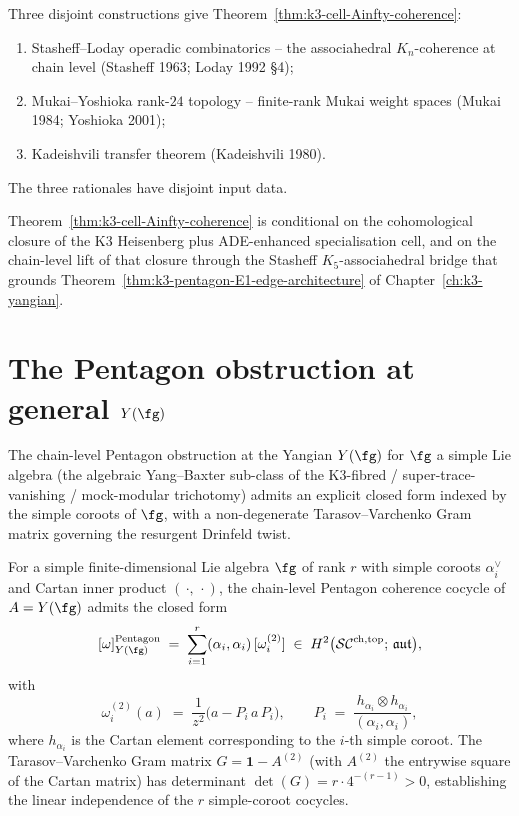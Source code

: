 \begin{remark}
\label{rem:k3-Ainfty-IV}
Three disjoint constructions give
Theorem~\ref{thm:k3-cell-Ainfty-coherence}:
\begin{enumerate}
\item Stasheff--Loday operadic combinatorics -- the associahedral
 $K_n$-coherence at chain level
 \textup{(}Stasheff 1963; Loday 1992 \S 4\textup{);}
\item Mukai--Yoshioka rank-$24$ topology -- finite-rank Mukai
 weight spaces
 \textup{(}Mukai 1984; Yoshioka 2001\textup{);}
\item Kadeishvili transfer theorem
 \textup{(}Kadeishvili 1980\textup{).}
\end{enumerate}
The three rationales have disjoint input data.
\end{remark}

\begin{remark}[Hypotheses]
\label{rem:k3-Ainfty-conditional}
Theorem~\ref{thm:k3-cell-Ainfty-coherence} is conditional on the
cohomological closure of the K$3$ Heisenberg plus ADE-enhanced
specialisation cell, and on the chain-level lift of that closure
through the Stasheff $K_5$-associahedral bridge that grounds
Theorem~\ref{thm:k3-pentagon-E1-edge-architecture} of
Chapter~\ref{ch:k3-yangian}.
\end{remark}


\section{The Pentagon obstruction at general \texorpdfstring{$Y(\fg)$}{Y(g)}}
\label{sec:Y-fg-Pentagon-obstruction}

The chain-level Pentagon obstruction at the Yangian $Y(\fg)$ for
$\fg$ a simple Lie algebra (the algebraic Yang--Baxter sub-class of
the K$3$-fibred / super-trace-vanishing / mock-modular trichotomy)
admits an explicit closed form indexed by the simple coroots of
$\fg$, with a non-degenerate Tarasov--Varchenko Gram matrix governing
the resurgent Drinfeld twist.

\begin{theorem}
\label{thm:Yfg-Pentagon-cartan-coroot}
For a simple finite-dimensional Lie algebra $\fg$ of rank $r$ with
simple coroots $\alpha_i^\vee$ and Cartan inner product
$(\,\cdot,\,\cdot)$, the chain-level Pentagon coherence cocycle of
$A = Y(\fg)$ admits the closed form
\[
 [\omega]^{\mathrm{Pentagon}}_{Y(\fg)}
 \;=\; \sum_{i = 1}^{r} (\alpha_i, \alpha_i)\,
 [\omega^{(2)}_i]
 \;\in\; H^2\bigl(\mathcal{SC}^{\mathrm{ch, top}};\, \mathfrak{aut}\bigr),
\]
with
\[
 \omega^{(2)}_i(a)
 \;=\; \frac{1}{z^2}\bigl(a - P_i\,a\,P_i\bigr),
 \qquad
 P_i \;=\; \frac{h_{\alpha_i} \otimes h_{\alpha_i}}{(\alpha_i, \alpha_i)},
\]
where $h_{\alpha_i}$ is the Cartan element corresponding to the
$i$-th simple coroot. The Tarasov--Varchenko Gram matrix
$G = \mathbf{1} - A^{(2)}$ \textup{(}with $A^{(2)}$ the entrywise
square of the Cartan matrix\textup{)} has determinant
$\det(G) = r \cdot 4^{-(r - 1)} > 0$, establishing the
linear independence of the $r$ simple-coroot cocycles.
\end{theorem}

